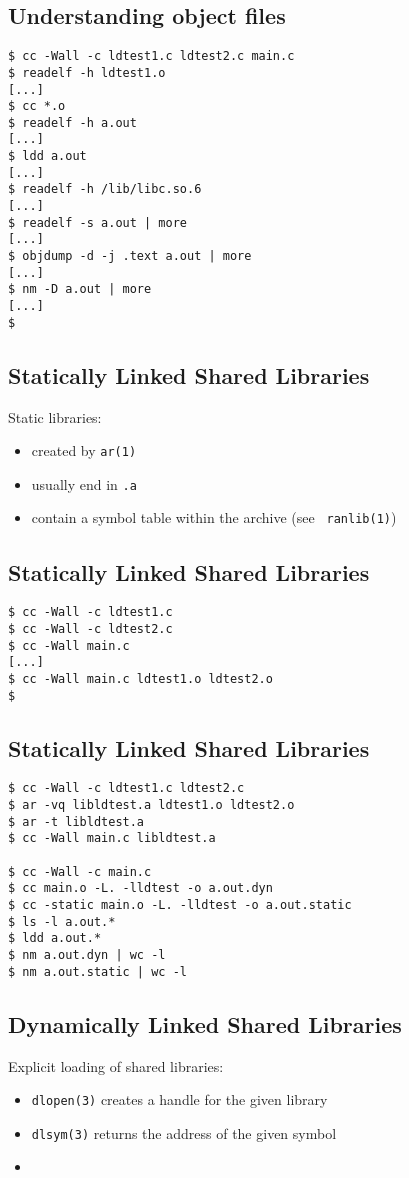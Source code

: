 \documentclass[xga]{xdvislides}
\begin{document}
\subsection{Understanding object files}
\begin{verbatim}
$ cc -Wall -c ldtest1.c ldtest2.c main.c
$ readelf -h ldtest1.o
[...]
$ cc *.o
$ readelf -h a.out
[...]
$ ldd a.out
[...]
$ readelf -h /lib/libc.so.6
[...]
$ readelf -s a.out | more
[...]
$ objdump -d -j .text a.out | more
[...]
$ nm -D a.out | more
[...]
$
\end{verbatim}

\subsection{Statically Linked Shared Libraries}
Static libraries:
\begin{itemize}
	\item created by {\tt ar(1)}
	\item usually end in {\tt .a}
	\item contain a symbol table within the archive (see {\tt
		ranlib(1)})
\end{itemize}

\subsection{Statically Linked Shared Libraries}
\begin{verbatim}
$ cc -Wall -c ldtest1.c
$ cc -Wall -c ldtest2.c
$ cc -Wall main.c
[...]
$ cc -Wall main.c ldtest1.o ldtest2.o
$
\end{verbatim}

\subsection{Statically Linked Shared Libraries}
\begin{verbatim}
$ cc -Wall -c ldtest1.c ldtest2.c
$ ar -vq libldtest.a ldtest1.o ldtest2.o
$ ar -t libldtest.a
$ cc -Wall main.c libldtest.a

$ cc -Wall -c main.c
$ cc main.o -L. -lldtest -o a.out.dyn
$ cc -static main.o -L. -lldtest -o a.out.static
$ ls -l a.out.*
$ ldd a.out.*
$ nm a.out.dyn | wc -l
$ nm a.out.static | wc -l
\end{verbatim}

\subsection{Dynamically Linked Shared Libraries}
Explicit loading of shared libraries:
\begin{itemize}
	\item {\tt dlopen(3)} creates a handle for the given library
	\item {\tt dlsym(3)} returns the address of the given symbol
	\item
\end{itemize}
\end{document}
